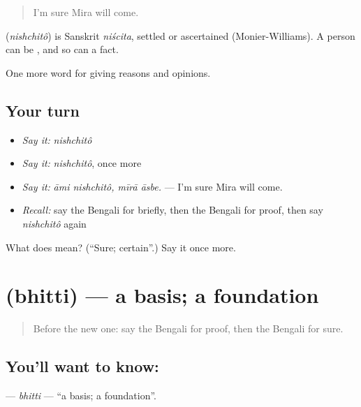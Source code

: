 \begin{quote}
I'm sure Mira will come.
\end{quote}

\begin{cousinweb}
\textbf{} (\emph{nishchitô}) is Sanskrit \emph{niścita}, settled or ascertained (Monier-Williams). A person can be , and so can a fact.
\end{cousinweb}

\begin{grammarlens}[title={What you've built}]
One more word for giving reasons and opinions.
\end{grammarlens}

\subsection*{Your turn}
\begin{itemize}
\raggedright
  \item \emph{Say it:} \emph{nishchitô}
  \item \emph{Say it:} \emph{nishchitô}, once more
  \item \emph{Say it:} \emph{āmi nishchitô, mīrā āsbe.} — I'm sure Mira will come.
  \item \emph{Recall:} say the Bengali for briefly, then the Bengali for proof, then say \emph{nishchitô} again
\end{itemize}

\begin{tcolorbox}[breakable,colback=teal!4,colframe=teal!35!black,title={Before you move on}]
What does  mean? (\textquotedblleft{}Sure; certain\textquotedblright{}.) Say it once more.
\end{tcolorbox}
\section[\texorpdfstring{\bn{ভিত্তি} (bhitti)}{ভিত্তি (bhitti)}]{ (bhitti) — a basis; a foundation}

\label{lesson:BN-C337-bhitti}



\begin{quote}
Before the new one: say the Bengali for proof, then the Bengali for sure.
\end{quote}

\subsection*{You'll want to know: }
\textbf{} — \emph{bhitti} — \textquotedblleft{}a basis; a foundation\textquotedblright{}.

